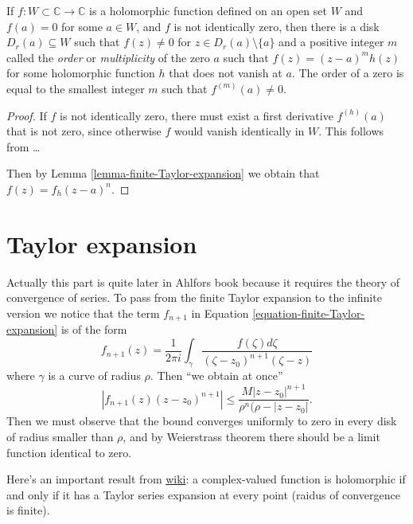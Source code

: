 \begin{theorem}
\label{theorem-zeroes-are-isolated-and-have-finite-order}
\begin{reference}
\cite[p. 13]{lec}
\end{reference}
If $f:W\subset\mathbb{C}\to \mathbb{C}$ is a holomorphic function defined on an
open set $W$ and $f(a)=0$ for some $a\in W$, and $f$ is not identically zero,
then there is a disk $D_r(a)\subseteq W$ such that $f(z)\neq 0$ for $z \in
D_r(a)\setminus\{a\}$ and a positive integer $m$ called the {\it order} or
{\it multiplicity} of the zero $a$ such that  $f(z)=(z-a)^mh(z)$ for some
holomorphic function $h$ that does not vanish at $a$. The order of a zero is
equal to the smallest integer $m$ such that $f^{(m)}(a)\neq 0$.
\end{theorem}

\begin{proof}
If $f$ is not identically zero, there must exist a first derivative $f^{
(h)}(a)$ that is not zero, since otherwise $f$ would vanish identically in $W$.
This follows from … 

Then by Lemma \ref{lemma-finite-Taylor-expansion} we obtain that
$f(z)=f_h(z-a)^n$.
\end{proof}

\section{Taylor expansion}
\label{section-Taylor-expansion}

\noindent
Actually this part is quite later in Ahlfors book because it requires
the theory of convergence of series.
To pass from the finite Taylor expansion to the
infinite version we notice that the 
term $f_{n+1}$ in Equation \ref{equation-finite-Taylor-expansion}
is of the form
$$
f_{n+1}(z)=\frac{1}{2\pi i}\int_\gamma \frac{f(\zeta)d\zeta}
{(\zeta-z_0)^{n+1}(\zeta-z)}
$$
where $\gamma$ is a curve of radius $\rho$.
Then ``we obtain at once''
$$
|f_{n+1}(z)(z-z_0)^{n+1}|\leq \frac{M|z-z_0|^{n+1}}{\rho^n(\rho-|z-z_0|}.
$$
Then we must observe that the bound converges uniformly
to zero in every disk of radius smaller than $\rho$,
and by Weierstrass theorem there should be a limit
function identical to zero.

\medskip\noindent
Here's an important result from
\href{https://en.wikipedia.org/wiki/Analyticity_of_holomorphic_functions}{wiki}:
a complex-valued function is holomorphic if and only if it
has a Taylor series expansion at every point (raidus of convergence is finite).

